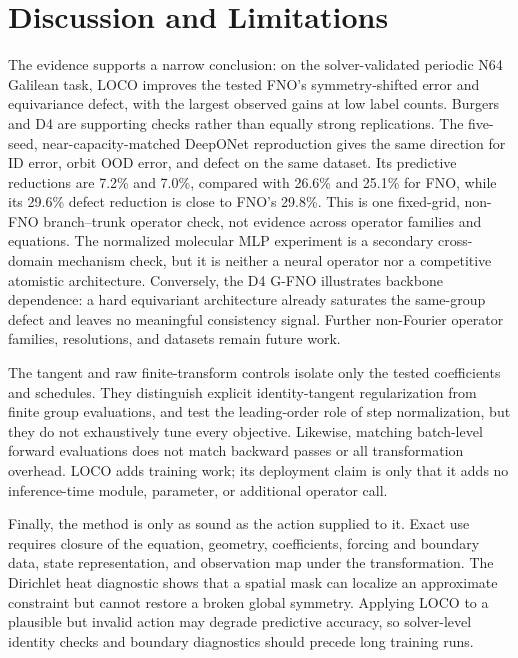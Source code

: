 \section{Discussion and Limitations}
\label{sec:discussion}

The evidence supports a narrow conclusion: on the solver-validated periodic N64
Galilean task, LOCO improves the tested FNO's symmetry-shifted error and
equivariance defect, with the largest observed gains at low label counts.  Burgers
and D4 are supporting checks rather than equally strong replications.  The
five-seed, near-capacity-matched DeepONet reproduction gives the same direction
for ID error, orbit OOD error, and defect on the same dataset.  Its predictive
reductions are 7.2\% and 7.0\%, compared with 26.6\% and 25.1\% for FNO, while
its 29.6\% defect reduction is close to FNO's 29.8\%.  This is one fixed-grid,
non-FNO branch--trunk operator check, not evidence across operator families and
equations.  The normalized molecular MLP experiment is a secondary
cross-domain mechanism check, but it is neither a neural operator nor a
competitive atomistic architecture.  Conversely, the D4 G-FNO illustrates
backbone dependence: a hard equivariant architecture already saturates the
same-group defect and leaves no meaningful consistency signal.  Further
non-Fourier operator families, resolutions, and datasets remain future work.

The tangent and raw finite-transform controls isolate only the tested
coefficients and schedules.  They distinguish explicit identity-tangent
regularization from finite group evaluations, and test the leading-order role of
step normalization, but they do not exhaustively tune every objective.  Likewise,
matching batch-level forward evaluations does not match backward passes or all
transformation overhead.  LOCO adds training work; its deployment claim is only
that it adds no inference-time module, parameter, or additional operator call.

Finally, the method is only as sound as the action supplied to it.  Exact use
requires closure of the equation, geometry, coefficients, forcing and boundary
data, state representation, and observation map under the transformation.  The
Dirichlet heat diagnostic shows that a spatial mask can localize an approximate
constraint but cannot restore a broken global symmetry.  Applying LOCO to a
plausible but invalid action may degrade predictive accuracy, so solver-level
identity checks and boundary diagnostics should precede long training runs.
